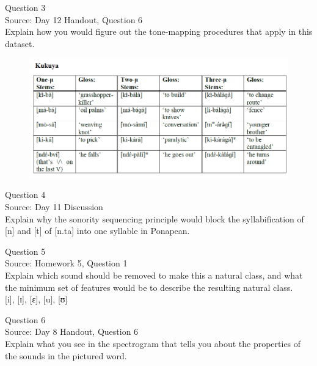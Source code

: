 \documentclass[12pt]{article}
\begin{document}
{\large Question 3}\\

Source: Day 12 Handout, Question 6\\

Explain how you would figure out the tone-mapping procedures that apply in this dataset.\\

\begin{figure}[H]
\includegraphics{../images/kukuya.png}
\end{figure}

\newpage

{\large Question 4}\\

Source: Day 11 Discussion\\

Explain why the sonority sequencing principle would block the syllabification of [n] and [t] of [n.ta] into one syllable in Ponapean.\\


\newpage

{\large Question 5}\\

Source: Homework 5, Question 1\\

Explain which sound should be removed to make this a natural class, and what the minimum set of features would be to describe the resulting natural class.\\

{[i]}, {[ɪ]}, {[ɛ]}, {[u]}, {[ʊ]}


\newpage

{\large Question 6}\\

Source: Day 8 Handout, Question 6\\

Explain what you see in the spectrogram that tells you about the properties of the sounds in the pictured word.\\
\end{document}
